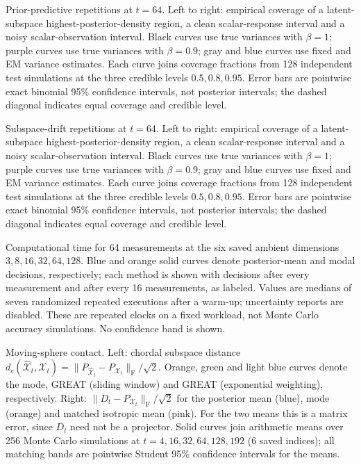 \caption{Prior-predictive repetitions at $t=64$. Left to right: empirical coverage of a latent-subspace highest-posterior-density region, a clean scalar-response interval and a noisy scalar-observation interval. Black curves use true variances with $\beta=1$; purple curves use true variances with $\beta=0.9$; gray and blue curves use fixed and EM variance estimates. Each curve joins coverage fractions from 128 independent test simulations at the three credible levels $0.5,0.8,0.95$. Error bars are pointwise exact binomial 95\% confidence intervals, not posterior intervals; the dashed diagonal indicates equal coverage and credible level.}

\caption{Subspace-drift repetitions at $t=64$. Left to right: empirical coverage of a latent-subspace highest-posterior-density region, a clean scalar-response interval and a noisy scalar-observation interval. Black curves use true variances with $\beta=1$; purple curves use true variances with $\beta=0.9$; gray and blue curves use fixed and EM variance estimates. Each curve joins coverage fractions from 128 independent test simulations at the three credible levels $0.5,0.8,0.95$. Error bars are pointwise exact binomial 95\% confidence intervals, not posterior intervals; the dashed diagonal indicates equal coverage and credible level.}

\caption{Computational time for 64 measurements at the six saved ambient dimensions $3,8,16,32,64,128$. Blue and orange solid curves denote posterior-mean and modal decisions, respectively; each method is shown with decisions after every measurement and after every 16 measurements, as labeled. Values are medians of seven randomized repeated executions after a warm-up; uncertainty reports are disabled. These are repeated clocks on a fixed workload, not Monte Carlo accuracy simulations. No confidence band is shown.}

\caption{Moving-sphere contact. Left: chordal subspace distance $d_c(\widehat{\mathcal X}_t,\mathcal X_t)=\|P_{\widehat{\mathcal X}_t}-P_{\mathcal X_t}\|_{\mathrm F}/\sqrt2$. Orange, green and light blue curves denote the mode, GREAT (sliding window) and GREAT (exponential weighting), respectively. Right: $\|D_t-P_{\mathcal X_t}\|_{\mathrm F}/\sqrt2$ for the posterior mean (blue), mode (orange) and matched isotropic mean (pink). For the two means this is a matrix error, since $D_t$ need not be a projector. Solid curves join arithmetic means over 256 Monte Carlo simulations at $t=4,16,32,64,128,192$ (6 saved indices); all matching bands are pointwise Student 95\% confidence intervals for the means.}

